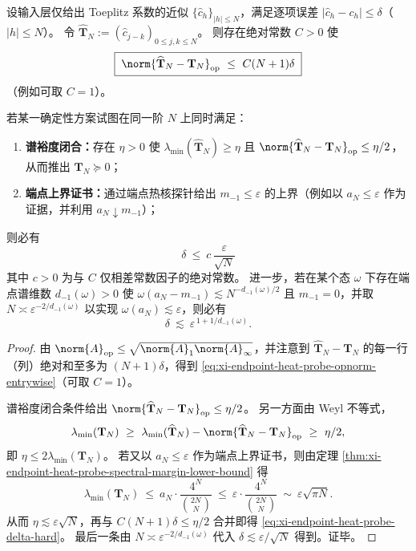 \begin{theorem}\label{thm:xi-endpoint-heat-probe-resolution-accuracy-hard-constraint}
设输入层仅给出 Toeplitz 系数的近似 \(\{\widehat c_h\}_{|h|\le N}\)，满足逐项误差
\(
|\widehat c_h-c_h|\le \delta
\)（\(|h|\le N\)）。
令 \(\widehat{\mathbf{T}}_N:=(\widehat c_{j-k})_{0\le j,k\le N}\)。
则存在绝对常数 \(C>0\) 使
\begin{equation}\label{eq:xi-endpoint-heat-probe-opnorm-entrywise}
\boxed{\;
\norm{\widehat{\mathbf{T}}_N-\mathbf{T}_N}_{\mathrm{op}}\ \le\ C(N+1)\delta\;}
\end{equation}
（例如可取 \(C=1\)）。
\par
若某一确定性方案试图在同一阶 \(N\) 上同时满足：
\begin{enumerate}
  \item \textbf{谱裕度闭合：}存在 \(\eta>0\) 使 \(\lambda_{\min}(\widehat{\mathbf{T}}_N)\ge \eta\) 且 \(\norm{\widehat{\mathbf{T}}_N-\mathbf{T}_N}_{\mathrm{op}}\le \eta/2\)，从而推出 \(\mathbf{T}_N\succeq 0\)；
  \item \textbf{端点上界证书：}通过端点热核探针给出 \(m_{-1}\le \varepsilon\) 的上界（例如以 \(a_N\le \varepsilon\) 作为证据，并利用 \(a_N\downarrow m_{-1}\)）；
\end{enumerate}
则必有
\begin{equation}\label{eq:xi-endpoint-heat-probe-delta-hard}
\boxed{\;
\delta\ \le\ c\,\frac{\varepsilon}{\sqrt N}\;}
\end{equation}
其中 \(c>0\) 为与 \(C\) 仅相差常数因子的绝对常数。
进一步，若在某个态 \(\omega\) 下存在端点谱维数 \(d_{-1}(\omega)>0\) 使
\(
\omega(a_N-m_{-1})\lesssim N^{-d_{-1}(\omega)/2}
\)
且 \(m_{-1}=0\)，并取 \(N\asymp \varepsilon^{-2/d_{-1}(\omega)}\) 以实现 \(\omega(a_N)\lesssim \varepsilon\)，则必有
\[
\delta\ \lesssim\ \varepsilon^{\,1+1/d_{-1}(\omega)}.
\]
\end{theorem}
\begin{proof}
由 \(\norm{A}_{\mathrm{op}}\le \sqrt{\norm{A}_1\norm{A}_\infty}\)，并注意到 \(\widehat{\mathbf{T}}_N-\mathbf{T}_N\) 的每一行（列）绝对和至多为 \((N+1)\delta\)，得到 \eqref{eq:xi-endpoint-heat-probe-opnorm-entrywise}（可取 \(C=1\)）。
\par
谱裕度闭合条件给出 \(\norm{\widehat{\mathbf{T}}_N-\mathbf{T}_N}_{\mathrm{op}}\le \eta/2\)。
另一方面由 Weyl 不等式，
\[
\lambda_{\min}(\mathbf{T}_N)\ \ge\ \lambda_{\min}(\widehat{\mathbf{T}}_N)-\norm{\widehat{\mathbf{T}}_N-\mathbf{T}_N}_{\mathrm{op}}
\ \ge\ \eta/2,
\]
即 \(\eta\le 2\lambda_{\min}(\mathbf{T}_N)\)。
若又以 \(a_N\le \varepsilon\) 作为端点上界证书，则由定理 \ref{thm:xi-endpoint-heat-probe-spectral-margin-lower-bound} 得
\[
\lambda_{\min}(\mathbf{T}_N)\ \le\ a_N\cdot \frac{4^N}{\binom{2N}{N}}
\ \le\ \varepsilon\cdot \frac{4^N}{\binom{2N}{N}}
\ \sim\ \varepsilon\sqrt{\pi N}.
\]
从而 \(\eta\lesssim \varepsilon\sqrt N\)，再与
\(
C(N+1)\delta\le \eta/2
\)
合并即得 \eqref{eq:xi-endpoint-heat-probe-delta-hard}。
最后一条由 \(N\asymp \varepsilon^{-2/d_{-1}(\omega)}\) 代入 \(\delta\lesssim \varepsilon/\sqrt N\) 得到。证毕。
\end{proof}


